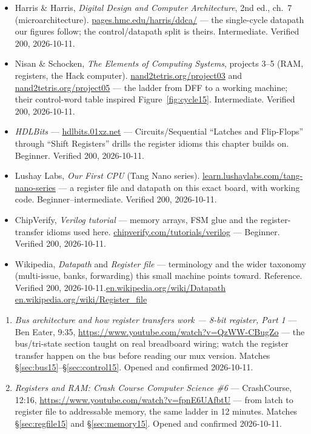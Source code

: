 \begin{itemize}
\item Harris \& Harris, \emph{Digital Design and Computer
Architecture}, 2nd ed., ch.~7 (microarchitecture).\newline
\url{pages.hmc.edu/harris/ddca/} --- the single-cycle datapath our
figures follow; the control/datapath split is theirs.
Intermediate. Verified 200, 2026-10-11.
\item Nisan \& Schocken, \emph{The Elements of Computing Systems},
projects 3--5 (RAM, registers, the Hack computer).\newline
\url{nand2tetris.org/project03} and \url{nand2tetris.org/project05}
--- the ladder from DFF to a working machine; their control-word
table inspired Figure~\ref{fig:cycle15}. Intermediate. Verified 200,
2026-10-11.
\item \emph{HDLBits} --- \url{hdlbits.01xz.net} ---
Circuits/Sequential ``Latches and Flip-Flops'' through ``Shift
Registers'' drills the register idioms this chapter builds on.
Beginner. Verified 200, 2026-10-11.
\item Lushay Labs, \emph{Our First CPU} (Tang Nano series).
\newline\url{learn.lushaylabs.com/tang-nano-series} --- a register
file and datapath on this exact board, with working code.
Beginner--intermediate. Verified 200, 2026-10-11.
\item ChipVerify, \emph{Verilog tutorial} --- memory arrays, FSM
glue and the register-transfer idioms used here.\newline
\url{chipverify.com/tutorials/verilog} --- Beginner. Verified 200,
2026-10-11.
\item Wikipedia, \emph{Datapath} and \emph{Register file} ---
terminology and the wider taxonomy (multi-issue, banks, forwarding)
this small machine points toward. Reference. Verified 200,
2026-10-11.\newline\url{en.wikipedia.org/wiki/Datapath}\newline
\url{en.wikipedia.org/wiki/Register_file}
\end{itemize}

\begin{rulebox}
\begin{enumerate}
\item \emph{Bus architecture and how register transfers work ---
8-bit register, Part 1} --- Ben Eater, 9:35,
\url{https://www.youtube.com/watch?v=QzWW-CBugZo} --- the bus/tri-state
section taught on real breadboard wiring; watch the register transfer
happen on the bus before reading our mux version. Matches
\S\ref{sec:bus15}--\S\ref{sec:control15}. Opened and confirmed
2026-10-11.
\item \emph{Registers and RAM: Crash Course Computer Science \#6}
--- CrashCourse, 12:16,
\url{https://www.youtube.com/watch?v=fpnE6UAfbtU} --- from latch to
register file to addressable memory, the same ladder in 12 minutes.
Matches \S\ref{sec:regfile15} and \S\ref{sec:memory15}. Opened and
confirmed 2026-10-11.
\end{enumerate}
\end{rulebox}

